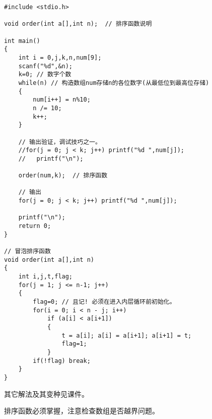 \begin{lstlisting}
#include <stdio.h>

void order(int a[],int n);  // 排序函数说明

int main()
{
	int i = 0,j,k,n,num[9];
	scanf("%d",&n);
	k=0; // 数字个数 
	while(n) // 构造数组num存储n的各位数字(从最低位到最高位存储)
	{
		num[i++] = n%10;
		n /= 10;
		k++;
	} 

	// 输出验证，调试技巧之一。 
	//for(j = 0; j < k; j++) printf("%d ",num[j]);
	//   printf("\n");
	
	order(num,k);  // 排序函数
	
	// 输出
	for(j = 0; j < k; j++) printf("%d ",num[j]);
	
	printf("\n");
	return 0;
} 

// 冒泡排序函数 
void order(int a[],int n)
{ 
	int i,j,t,flag; 
	for(j = 1; j <= n-1; j++)
	{ 
		flag=0; // 且记! 必须在进入内层循环前初始化。
		for(i = 0; i < n - j; i++)
			if (a[i] < a[i+1]) 
			{ 
				t = a[i]; a[i] = a[i+1]; a[i+1] = t; 
				flag=1;
			}
		if(!flag) break;
	}
}
\end{lstlisting}

\begin{note}[要点]
	其它解法及其变种见课件。
	
	排序函数必须掌握，注意检查数组是否越界问题。
\end{note}

